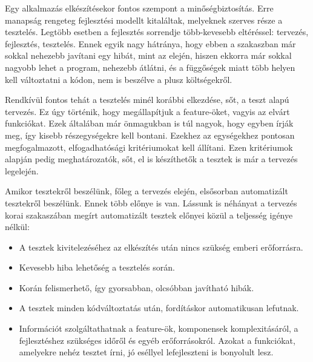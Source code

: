 



Egy alkalmazás elkészítésekor fontos szempont a minőségbiztosítás. Erre manapság rengeteg fejlesztési modellt kitaláltak, melyeknek szerves része a tesztelés. Legtöbb esetben a fejlesztés sorrendje több-kevesebb eltéréssel: tervezés, fejlesztés, tesztelés. Ennek egyik nagy hátránya, hogy ebben a szakaszban már sokkal nehezebb javítani egy hibát, mint az elején, hiszen ekkorra már sokkal nagyobb lehet a program, nehezebb átlátni, és a függőségek miatt több helyen kell változtatni a kódon, nem is beszélve a plusz költségekről. 

Rendkívül fontos tehát a tesztelés minél korábbi elkezdése, sőt, a teszt alapú tervezés. Ez úgy történik, hogy megállapítjuk a feature-öket, vagyis az elvárt funkciókat. Ezek általában már önmagukban is túl nagyok, hogy egyben írják meg, így kisebb részegységekre kell bontani. Ezekhez az egységekhez pontosan megfogalmazott, elfogadhatósági kritériumokat kell állítani. Ezen kritériumok alapján pedig meghatározatók, sőt, el is készíthetők a tesztek is már a tervezés legelején.

Amikor tesztekről beszélünk, főleg a tervezés elején, elsősorban automatizált tesztekről beszélünk. Ennek több előnye is van. Lássunk is néhányat a tervezés korai szakaszában megírt automatizált tesztek előnyei közül a teljesség igénye nélkül:
\begin{itemize}
	\item A tesztek kivitelezéséhez az elkészítés után nincs szükség emberi erőforrásra.
	\item Kevesebb hiba lehetőség a tesztelés során.
	\item Korán felismerhető, így gyorsabban, olcsóbban javítható hibák.
	\item A tesztek minden kódváltoztatás után, fordításkor automatikusan lefutnak.
	\item Információt szolgáltathatnak a feature-ök, komponensek komplexitásáról, a fejlesztéshez szükséges időről és egyéb erőforrásokról. Azokat a funkciókat, amelyekre nehéz tesztet írni, jó eséllyel lefejleszteni is bonyolult lesz.
\end{itemize}

